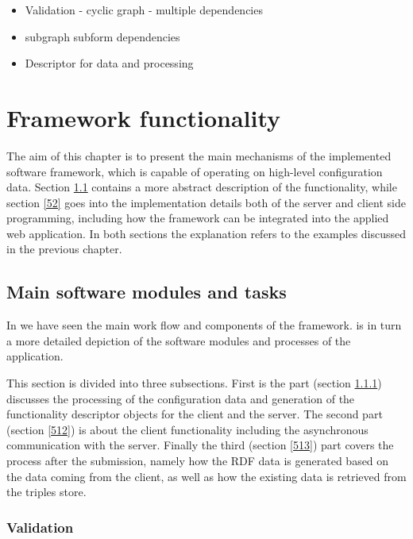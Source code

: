 \begin{itemize}	
	\item{Validation - cyclic graph - multiple dependencies}
	\item{subgraph subform dependencies}
	\item{Descriptor for data and processing}
\end{itemize}

\chapter{Framework functionality} \label{5}


The aim of this chapter is to present the main mechanisms of the implemented software framework, which is capable of operating on high-level configuration data. Section \ref{51} contains a more abstract description of the functionality, while section \ref{52} goes into the implementation details both of the server and client side programming, including how the framework can be integrated into the applied web application. In both sections the explanation refers to the examples discussed in the previous chapter.


\section{Main software modules and tasks} \label{51}


In  we have seen the main work flow and components of the framework.  is in turn a more detailed depiction of the software modules and processes of the application.




This section is divided into three subsections. First is the part (section \ref{511}) discusses the  processing of the configuration data and generation of the functionality descriptor objects for the client and the server. The second part (section \ref{512}) is about the client functionality including the asynchronous communication with the server. Finally the third (section \ref{513}) part covers the process after the submission, namely how the RDF data is generated based on the data coming from the client, as well as how the existing data is retrieved from the triples store.


\subsection{Validation} \label{511}


